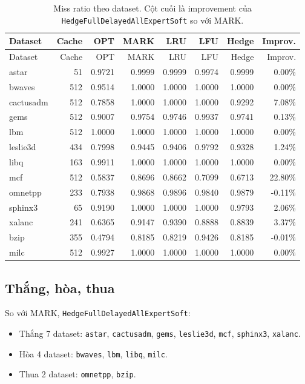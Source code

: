 \documentclass[11pt,a4paper]{article}
\newcommand{\code}[1]{\texttt{#1}}
\newcommand{\hedge}{\code{HedgeFullDelayedAllExpertSoft}}
\begin{document}
\begin{landscape}
\begin{longtable}{lrrrrrrr}
\caption{Miss ratio theo dataset. Cột cuối là improvement của \hedge{} so với MARK.}\\
\toprule
Dataset & Cache & OPT & MARK & LRU & LFU & Hedge & Improv. \\
\midrule
\endfirsthead
\toprule
Dataset & Cache & OPT & MARK & LRU & LFU & Hedge & Improv. \\
\midrule
\endhead
astar & 51 & 0.9721 & 0.9999 & 0.9999 & 0.9974 & 0.9999 & 0.00\% \\
bwaves & 512 & 0.9514 & 1.0000 & 1.0000 & 1.0000 & 1.0000 & 0.00\% \\
cactusadm & 512 & 0.7858 & 1.0000 & 1.0000 & 1.0000 & 0.9292 & 7.08\% \\
gems & 512 & 0.9007 & 0.9754 & 0.9746 & 0.9937 & 0.9741 & 0.13\% \\
lbm & 512 & 1.0000 & 1.0000 & 1.0000 & 1.0000 & 1.0000 & 0.00\% \\
leslie3d & 434 & 0.7998 & 0.9445 & 0.9406 & 0.9792 & 0.9328 & 1.24\% \\
libq & 163 & 0.9911 & 1.0000 & 1.0000 & 1.0000 & 1.0000 & 0.00\% \\
mcf & 512 & 0.5837 & 0.8696 & 0.8662 & 0.7099 & 0.6713 & 22.80\% \\
omnetpp & 233 & 0.7938 & 0.9868 & 0.9896 & 0.9840 & 0.9879 & -0.11\% \\
sphinx3 & 65 & 0.9190 & 1.0000 & 1.0000 & 1.0000 & 0.9793 & 2.06\% \\
xalanc & 241 & 0.6365 & 0.9147 & 0.9390 & 0.8888 & 0.8839 & 3.37\% \\
bzip & 355 & 0.4794 & 0.8185 & 0.8219 & 0.9426 & 0.8185 & -0.01\% \\
milc & 512 & 0.9927 & 1.0000 & 1.0000 & 1.0000 & 1.0000 & 0.00\% \\
\bottomrule
\end{longtable}
\end{landscape}

\subsection{Thắng, hòa, thua}

So với MARK, \hedge{}:

\begin{itemize}[leftmargin=1.4em]
    \item Thắng 7 dataset: \code{astar}, \code{cactusadm}, \code{gems}, \code{leslie3d}, \code{mcf}, \code{sphinx3}, \code{xalanc}.
    \item Hòa 4 dataset: \code{bwaves}, \code{lbm}, \code{libq}, \code{milc}.
    \item Thua 2 dataset: \code{omnetpp}, \code{bzip}.
\end{itemize}
\end{document}

